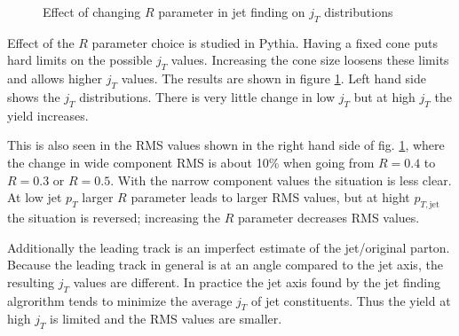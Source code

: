 \begin{figure}[htp]
\centering
{}
\caption[Pythia $R$ parameters $j_T$]{Effect of changing $R$ parameter in jet finding on $j_T$ distributions}
\label{fig:Rcomparison}
\end{figure}


Effect of the $R$ parameter choice is studied in Pythia. Having a fixed cone puts hard limits on the possible $j_T$ values. Increasing the cone size loosens these limits and allows higher $j_T$ values. The results are shown in figure \ref{fig:Rcomparison}. Left hand side shows the $j_T$ distributions. There is very little change in low $j_T$ but at high $j_T$ the yield increases. 

This is also seen in the RMS values shown in the right hand side of fig. \ref{fig:Rcomparison}, where the change in wide component RMS is about 10\% when going from $R=0.4$ to $R=0.3$ or $R=0.5$. With the narrow component values the situation is less clear. At low jet $p_T$ larger $R$ parameter leads to larger RMS values, but at hight $p_{T,\mathrm{jet}}$ the situation is reversed; increasing the $R$ parameter decreases RMS values.

Additionally the leading track is an imperfect estimate of the jet/original parton. Because the leading track in general is at an angle compared to the jet axis, the resulting $j_T$ values are different. In practice the jet axis found by the jet finding algrorithm tends to minimize the average $j_T$ of jet constituents. Thus the yield at high $j_T$ is limited and the RMS values are smaller.


